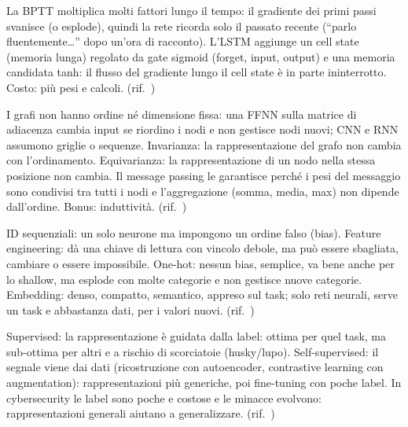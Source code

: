 \begin{soluzione}
La BPTT moltiplica molti fattori lungo il tempo: il gradiente dei primi passi svanisce (o esplode), quindi la
        rete ricorda solo il passato recente (``parlo fluentemente\ldots'' dopo un'ora di racconto). L'LSTM aggiunge un cell state (memoria lunga)
        regolato da gate sigmoid (forget, input, output) e una memoria candidata tanh: il flusso del gradiente lungo il cell state è in parte
        ininterrotto. Costo: più pesi e calcoli.
(rif.\ )
\end{soluzione}

\begin{soluzione}[A10 -- GNN]
I grafi non hanno ordine né dimensione fissa: una FFNN sulla matrice di adiacenza cambia input se riordino i nodi e non
        gestisce nodi nuovi; CNN e RNN assumono griglie o sequenze. Invarianza: la rappresentazione del grafo non cambia con l'ordinamento.
        Equivarianza: la rappresentazione di un nodo nella stessa posizione non cambia. Il message passing le garantisce perché i pesi del messaggio
        sono condivisi tra tutti i nodi e l'aggregazione (somma, media, max) non dipende dall'ordine. Bonus: induttività.
(rif.\ )
\end{soluzione}

\begin{soluzione}
ID sequenziali: un solo neurone ma impongono un ordine falso (bias). Feature engineering: dà una chiave
        di lettura con vincolo debole, ma può essere sbagliata, cambiare o essere impossibile. One-hot: nessun bias, semplice, va bene anche per lo
        shallow, ma esplode con molte categorie e non gestisce nuove categorie. Embedding: denso, compatto, semantico, appreso sul task; solo reti
        neurali, serve un task e abbastanza dati,  per i valori nuovi.
(rif.\ )
\end{soluzione}

\begin{soluzione}
Supervised: la rappresentazione è guidata dalla label: ottima per quel task, ma sub-ottima per
        altri e a rischio di scorciatoie (husky/lupo). Self-supervised: il segnale viene dai dati (ricostruzione con autoencoder, contrastive
        learning con augmentation): rappresentazioni più generiche, poi fine-tuning con poche label. In cybersecurity le label sono poche e costose
        e le minacce evolvono: rappresentazioni generali aiutano a generalizzare.
(rif.\ )
\end{soluzione}

